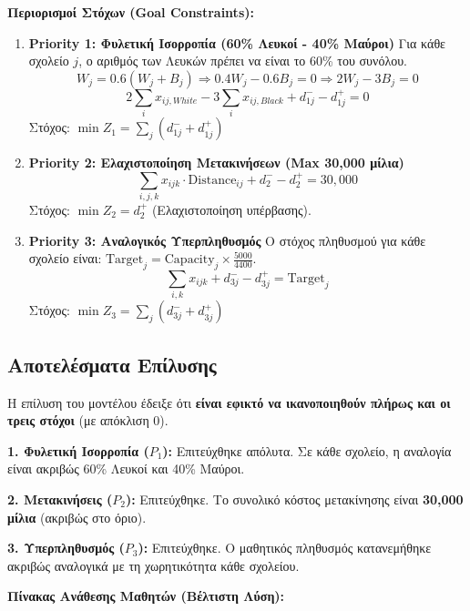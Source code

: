 \documentclass[12pt, a4paper]{article}
\begin{document}
\textbf{Περιορισμοί Στόχων (Goal Constraints):}

\begin{enumerate}
    \item \textbf{Priority 1: Φυλετική Ισορροπία (60\% Λευκοί - 40\% Μαύροι)}
    Για κάθε σχολείο $j$, ο αριθμός των Λευκών πρέπει να είναι το 60\% του συνόλου.
    $$ W_j = 0.6 (W_j + B_j) \Rightarrow 0.4 W_j - 0.6 B_j = 0 \Rightarrow 2 W_j - 3 B_j = 0 $$
    $$ 2 \sum_i x_{ij,White} - 3 \sum_i x_{ij,Black} + d_{1j}^- - d_{1j}^+ = 0 $$
    Στόχος: $\min Z_1 = \sum_j (d_{1j}^- + d_{1j}^+)$

    \item \textbf{Priority 2: Ελαχιστοποίηση Μετακινήσεων (Max 30,000 μίλια)}
    $$ \sum_{i,j,k} x_{ijk} \cdot \text{Distance}_{ij} + d_2^- - d_2^+ = 30,000 $$
    Στόχος: $\min Z_2 = d_2^+$ (Ελαχιστοποίηση υπέρβασης).

    \item \textbf{Priority 3: Αναλογικός Υπερπληθυσμός}
    Ο στόχος πληθυσμού για κάθε σχολείο είναι: $\text{Target}_j = \text{Capacity}_j \times \frac{5000}{4400}$.
    $$ \sum_{i,k} x_{ijk} + d_{3j}^- - d_{3j}^+ = \text{Target}_j $$
    Στόχος: $\min Z_3 = \sum_j (d_{3j}^- + d_{3j}^+)$
\end{enumerate}

\subsection*{Αποτελέσματα Επίλυσης}

Η επίλυση του μοντέλου έδειξε ότι \textbf{είναι εφικτό να ικανοποιηθούν πλήρως και οι τρεις στόχοι} (με απόκλιση 0).

\textbf{1. Φυλετική Ισορροπία ($P_1$):}
Επιτεύχθηκε απόλυτα. Σε κάθε σχολείο, η αναλογία είναι ακριβώς 60\% Λευκοί και 40\% Μαύροι.

\textbf{2. Μετακινήσεις ($P_2$):}
Επιτεύχθηκε. Το συνολικό κόστος μετακίνησης είναι \textbf{30,000 μίλια} (ακριβώς στο όριο).

\textbf{3. Υπερπληθυσμός ($P_3$):}
Επιτεύχθηκε. Ο μαθητικός πληθυσμός κατανεμήθηκε ακριβώς αναλογικά με τη χωρητικότητα κάθε σχολείου.

\textbf{Πίνακας Ανάθεσης Μαθητών (Βέλτιστη Λύση):}
\end{document}
